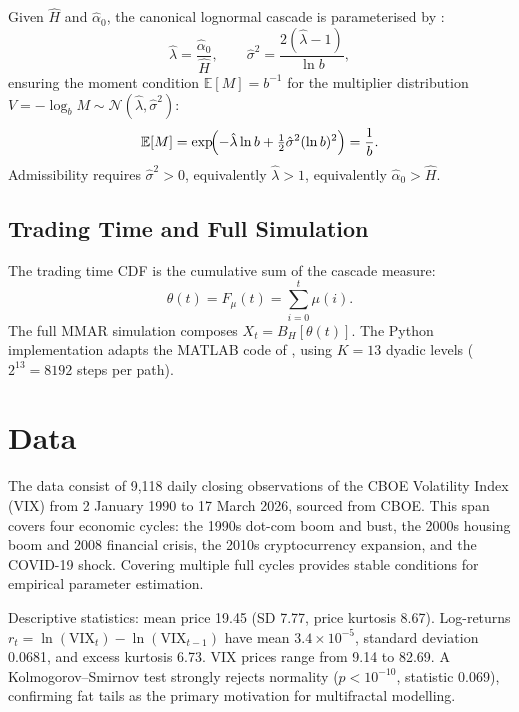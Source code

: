 \documentclass[12pt,a4paper]{article}
\begin{document}
Given $\hat{H}$ and $\hat{\alpha}_0$, the canonical lognormal cascade
is parameterised by \citep{mandelbrot1997}:
\begin{equation}
  \hat{\lambda} = \frac{\hat{\alpha}_0}{\hat{H}},
  \qquad
  \hat{\sigma}^2 = \frac{2(\hat{\lambda}-1)}{\ln b},
  \label{eq:cascade-params}
\end{equation}
ensuring the moment condition $\mathbb{E}[M] = b^{-1}$ for the
multiplier distribution $V = -\log_b M \sim \mathcal{N}(\hat{\lambda},
\hat{\sigma}^2)$:
\begin{equation}
  \mathbb{E}[M]
  = \exp\!\Bigl(-\hat{\lambda}\ln b
    + \tfrac{1}{2}\hat{\sigma}^2(\ln b)^2\Bigr)
  = \frac{1}{b}.
  \label{eq:moment-condition}
\end{equation}
Admissibility requires $\hat{\sigma}^2 > 0$, equivalently
$\hat{\lambda} > 1$, equivalently $\hat{\alpha}_0 > \hat{H}$.

\subsection{Trading Time and Full Simulation}

The trading time CDF is the cumulative sum of the cascade measure:
\begin{equation}
  \theta(t) = F_\mu(t) = \sum_{i=0}^t \mu(i).
  \label{eq:trading-time}
\end{equation}
The full MMAR simulation composes $X_t = B_H[\theta(t)]$. The Python
implementation adapts the MATLAB code of \citet{wengert2010}, using
$K = 13$ dyadic levels ($2^{13} = 8192$ steps per path).

\section{Data}

The data consist of 9,118 daily closing observations of the CBOE
Volatility Index (VIX) from 2 January 1990 to 17 March 2026, sourced
from CBOE. This span covers four economic cycles: the 1990s dot-com
boom and bust, the 2000s housing boom and 2008 financial crisis, the
2010s cryptocurrency expansion, and the COVID-19 shock. Covering
multiple full cycles provides stable conditions for empirical parameter
estimation.

Descriptive statistics: mean price 19.45 (SD 7.77, price kurtosis
8.67). Log-returns $r_t = \ln(\text{VIX}_t) - \ln(\text{VIX}_{t-1})$
have mean $3.4 \times 10^{-5}$, standard deviation 0.0681, and excess
kurtosis 6.73. VIX prices range from 9.14 to 82.69. A
Kolmogorov--Smirnov test strongly rejects normality ($p < 10^{-10}$,
statistic 0.069), confirming fat tails as the primary motivation for
multifractal modelling.
\end{document}
